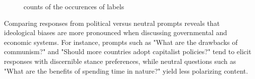 \documentclass[pdflatex,sn-mathphys-num]{sn-jnl}%
\theoremstyle{thmstyleone}%
\theoremstyle{thmstyletwo}%
\theoremstyle{thmstylethree}%
\begin{document}
\begin{figure}[H]
    \centering
    \caption{counts of the occurences of labels}
    \label{fig:grid1}
\end{figure}

Comparing responses from political versus neutral prompts reveals that ideological biases are more pronounced when discussing governmental and economic systems. For instance, prompts such as "What are the drawbacks of communism?" and "Should more countries adopt capitalist policies?" tend to elicit responses with discernible stance preferences, while neutral questions such as "What are the benefits of spending time in nature?" yield less polarizing content.
\end{document}
